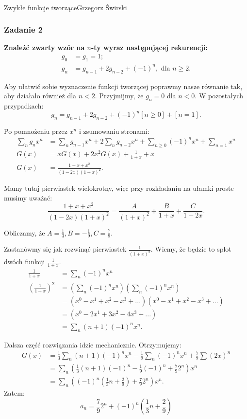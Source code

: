 \begin{referat}{Zwykłe funkcje tworzące}{Grzegorz Świrski}
\subsubsection{Zadanie 2}
\textbf{Znaleźć zwarty wzór na $n$-ty wyraz następującej rekurencji:}
\begin{align*}
  g_0 &= g_1 = 1; \\
  g_n &= g_{n-1} + 2g_{n-2} + (-1)^n, \text{ dla } n \geqslant 2.
\end{align*}

Aby ułatwić sobie wyznaczenie funkcji tworzącej poprawmy nasze
równanie tak, aby działało również dla $n < 2$. 
Przyjmijmy, że $g_n = 0$ dla $n < 0$. W pozostałych przypadkach:
$$g_n = g_{n-1} + 2g_{n-2} + (-1)^n[n \geqslant 0] + [n = 1].$$

Po pomnożeniu przez $x^n$ i zsumowaniu stronami:
\begin{align*}
\sum_n g_nx^n &= \sum_n g_{n-1}x^n + 2 \sum_n g_{n-2}x^n + 
  \sum_{n \geqslant 0} (-1)^n x^n + \sum_{n=1} x^n \\
G(x) &= xG(x) + 2x^2G(x) + \frac{1}{1+x} + x \\
G(x) &= \frac{1+x+x^2}{(1-2x)(1+x)^2}.
\end{align*}

Mamy tutaj pierwiastek wielokrotny, więc przy rozkładaniu na ułamki proste
musimy uważać:
$$\frac{1+x+x^2}{(1-2x)(1+x)^2} = \frac{A}{(1+x)^2} + \frac{B}{1+x} + \frac{C}{1-2x}.$$

Obliczamy, że $A = \frac{1}{3}, B = -\frac{1}{9}, C = \frac{7}{9}$.

Zastanówmy się jak rozwinąć pierwiastek $\frac{1}{(1+x)^2}$. Wiemy, że będzie to
splot dwóch funkcji $\frac{1}{1+x}$.
\begin{align*}
  \frac{1}{1+x} &= \sum_n (-1)^n x^n \\
  \left(\frac{1}{1+x}\right)^2 &= \left(\sum_n (-1)^n x^n\right)\left(\sum_n (-1)^n x^n\right) \\
    &= (x^0 - x^1 + x^2 - x^3 + ...)(x^0 - x^1 + x^2 - x^3 + ...) \\
    &= (x^0 - 2x^1 + 3x^2 - 4x^3 + ...) \\
    &= \sum_n (n+1)(-1)^nx^n.
\end{align*}

Dalsza część rozwiązania idzie mechanicznie. Otrzymujemy:
\begin{align*}
G(x) &= \frac{1}{3} \sum_n (n+1)(-1)^nx^n - \frac{1}{9} \sum_n (-1)^n x^n + \frac{7}{9} \sum (2x)^n \\
     &= \sum_n \left(\frac{1}{3}(n+1)(-1)^n - \frac{1}{9}(-1)^n + \frac{7}{9}2^n\right)x^n \\
     &= \sum_n \left((-1)^n \left(\frac{1}{3}n + \frac{2}{9}\right) + \frac{7}{9}2^n\right)x^n.
\end{align*}
Zatem:
$$a_n = \frac{7}{9}2^n + (-1)^n\left(\frac{1}{3}n + \frac{2}{9}\right)$$


\end{referat}
